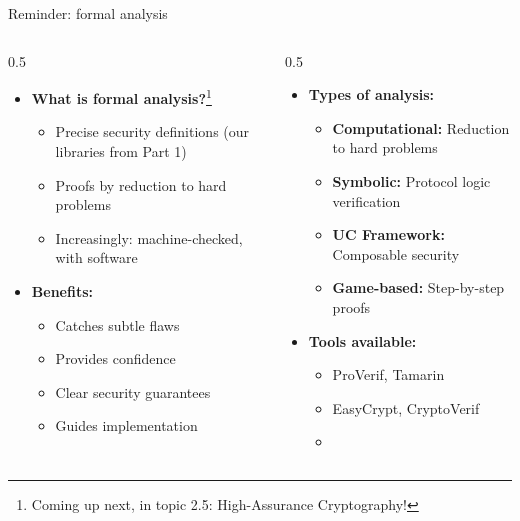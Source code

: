 \ifdefined\PRESENTATION\else\PassOptionsToClass{handout}{beamer}\fi\documentclass[aspectratio=169, lualatex]{beamer}
\begin{document}
\begin{frame}{Reminder: formal analysis}
	\begin{columns}[c]
		\begin{column}{0.5\textwidth}
			\begin{itemize}
				\item \textbf{What is formal analysis?}\footnote{Coming up next, in topic 2.5: High-Assurance Cryptography!}
				      \begin{itemize}
					      \item Precise security definitions (our libraries from Part 1)
					      \item Proofs by reduction to hard problems
					      \item Increasingly: machine-checked, with software
				      \end{itemize}
				\item \textbf{Benefits:}
				      \begin{itemize}
					      \item Catches subtle flaws
					      \item Provides confidence
					      \item Clear security guarantees
					      \item Guides implementation
				      \end{itemize}
			\end{itemize}
		\end{column}
		\begin{column}{0.5\textwidth}
			\begin{itemize}
				\item \textbf{Types of analysis:}
				      \begin{itemize}
					      \item \textbf{Computational:} Reduction to hard problems
					      \item \textbf{Symbolic:} Protocol logic verification
					      \item \textbf{UC Framework:} Composable security
					      \item \textbf{Game-based:} Step-by-step proofs
				      \end{itemize}
				\item \textbf{Tools available:}
				      \begin{itemize}
					      \item ProVerif, Tamarin
					      \item EasyCrypt, CryptoVerif
					      \item \fstar
				      \end{itemize}
			\end{itemize}
		\end{column}
	\end{columns}
\end{frame}
\end{document}
